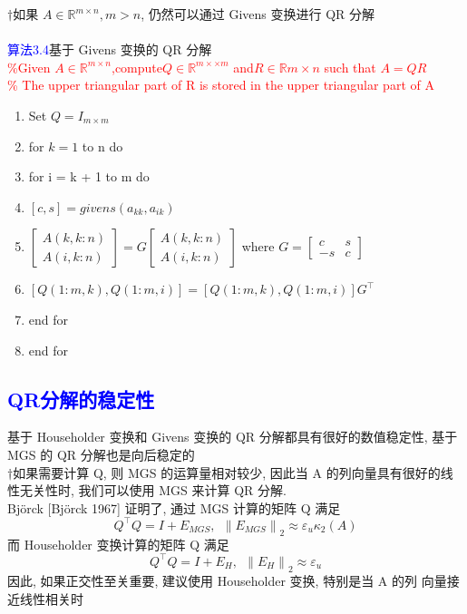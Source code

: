 \documentclass[12pt,a4paper]{article}
\begin{document}
$\dagger$如果 $A \in \mathbb{R}^{m\times n}, m > n$, 仍然可以通过 Givens 变换进行 QR 分解\\
\\
\textcolor{blue}{算法3.4}基于 Givens 变换的 QR 分解\\
\textcolor{red}{\%Given $A \in \mathbb{R}^{m\times n}$,compute$Q \in \mathbb{R}^{m×\times m}$ and$R\in \mathbb{R}{m\times n}$ such that $A = QR$\\
\% The upper triangular part of R is stored in the upper triangular part of A}
\begin{enumerate}[1:]
\item Set $Q=I_{m\times m}$
\item for $k=1$ to n do
\item \qquad for i = k + 1 to m do
\item \qquad \qquad $[c, s]=givens(a_{kk}, a_{ik})$
\item \qquad \qquad $\left[\begin{array}{c}{A(k, k : n)} \\ {A(i, k : n)}\end{array}\right]=G\left[\begin{array}{c}{A(k, k : n)} \\ {A(i, k : n)}\end{array}\right]$ where $G=\left[\begin{array}{cc}{c} & {s} \\ {-s} & {c}\end{array}\right]$
\item \qquad \qquad $[Q(1 : m, k), Q(1 : m, i)]=[Q(1 : m, k), Q(1 : m, i)] G^{\top}$
\item \qquad end for
\item end for
\end{enumerate}
\subsection{\textcolor{blue}{QR分解的稳定性}}
\noindent 基于 Householder 变换和 Givens 变换的 QR 分解都具有很好的数值稳定性, 基于 MGS 的 QR 分解也是向后稳定的\\
$\dagger$如果需要计算 Q, 则 MGS 的运算量相对较少, 因此当 A 的列向量具有很好的线性无关性时, 我们可以使用 MGS 来计算 QR 分解.\\
Björck [Björck 1967] 证明了, 通过 MGS 计算的矩阵 Q 满足
$$
Q^{\top} Q=I+E_{M G S},~~\left\|E_{M G S}\right\|_{2} \approx \varepsilon_{u} \kappa_{2}(A)
$$
而 Householder 变换计算的矩阵 Q 满足
$$
Q^{\top} Q=I+E_{H},~~\left\|E_{H}\right\|_{2} \approx \varepsilon_{u}
$$
因此, 如果正交性至关重要, 建议使用 Householder 变换, 特别是当 A 的列 向量接近线性相关时
\end{document}
